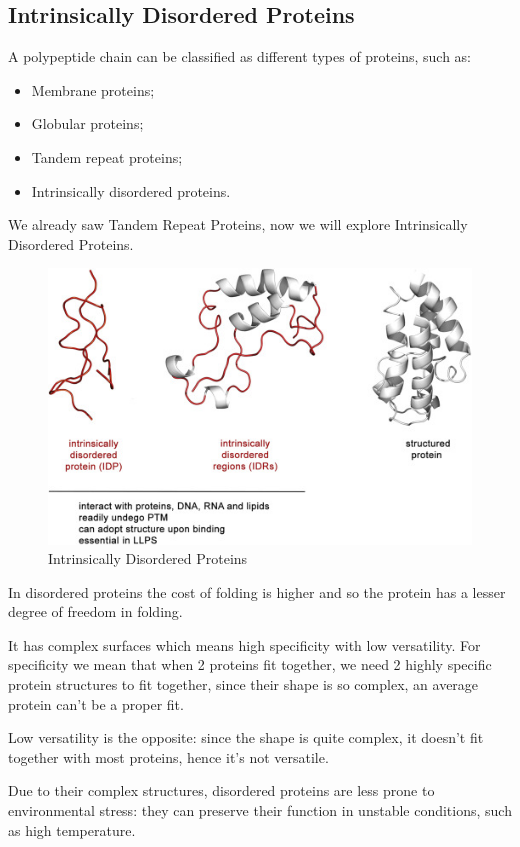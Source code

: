 \subsection{Intrinsically Disordered Proteins}
A polypeptide chain can be classified as different types of proteins, such as:
\begin{itemize}
	\item Membrane proteins;
	\item Globular proteins;
	\item Tandem repeat proteins;
	\item Intrinsically disordered proteins.
\end{itemize}
We already saw Tandem Repeat Proteins, now we will explore Intrinsically Disordered Proteins.

\begin{figure}[h!]
	\includegraphics[scale=0.8]{res/proteins_overview/disordered.png}
	\centering
	\caption{Intrinsically Disordered Proteins}
	\label{fig:tandem}
\end{figure}
In disordered proteins the cost of folding is higher and so the protein has a lesser degree of freedom in folding.

It has complex surfaces which means high specificity with low versatility. For specificity we mean that when 2 proteins fit together, we need 2 highly specific protein structures to fit together, since their shape is so complex, an average protein can't be a proper fit.

Low versatility is the opposite: since the shape is quite complex, it doesn't fit together with most proteins, hence it's not versatile.

Due to their complex structures, disordered proteins are less prone to environmental stress: they can preserve their function in unstable conditions, such as high temperature.

